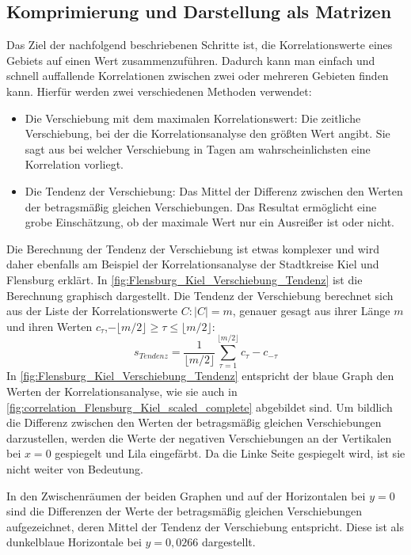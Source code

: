 \subsection{Komprimierung und Darstellung als Matrizen}\label{sec:Grundlagen:Korrelation:Komprimierung}
Das Ziel der nachfolgend beschriebenen Schritte ist, die Korrelationswerte eines Gebiets auf einen Wert zusammenzuführen. Dadurch kann man einfach und schnell auffallende Korrelationen zwischen zwei oder mehreren Gebieten finden kann.
Hierfür werden zwei verschiedenen Methoden verwendet:
\begin{itemize}
    \item Die Verschiebung mit dem maximalen Korrelationswert: Die zeitliche Verschiebung, bei der die Korrelationsanalyse den größten Wert angibt. Sie sagt aus bei welcher Verschiebung in Tagen am wahrscheinlichsten eine Korrelation vorliegt.
    \item Die Tendenz der Verschiebung: 
    Das Mittel der Differenz zwischen den Werten der betragsmäßig gleichen Verschiebungen.
    Das Resultat ermöglicht eine grobe Einschätzung, ob der maximale Wert nur ein Ausreißer ist oder nicht.
\end{itemize}

Die Berechnung der Tendenz der Verschiebung ist etwas komplexer und wird daher ebenfalls am Beispiel der Korrelationsanalyse der Stadtkreise Kiel und Flensburg erklärt.
In \autoref{fig:Flensburg_Kiel_Verschiebung_Tendenz} ist die Berechnung graphisch dargestellt.
Die Tendenz der Verschiebung berechnet sich aus der Liste der Korrelationswerte $C:\vert C\vert =m$, genauer gesagt aus ihrer Länge $m$ und ihren Werten $c_\tau$,$ -\lfloor m/2 \rfloor\geq \tau\leq \lfloor m/2 \rfloor$:
\begin{equation}
    s_{Tendenz} = \frac{1}{\lfloor m/2 \rfloor}
    \sum_{\tau=1}^{\lfloor m/2 \rfloor}c_{\tau}-c_{-\tau}
\end{equation}
In \autoref{fig:Flensburg_Kiel_Verschiebung_Tendenz} entspricht der blaue Graph den Werten der Korrelationsanalyse, wie sie auch in \autoref{fig:correlation_Flensburg_Kiel_scaled_complete} abgebildet sind. Um bildlich die Differenz zwischen den Werten der betragsmäßig gleichen Verschiebungen darzustellen, werden die Werte der negativen Verschiebungen an der Vertikalen bei $x=0$ gespiegelt und Lila eingefärbt.
Da die Linke Seite gespiegelt wird, ist sie nicht weiter von Bedeutung.

In den Zwischenräumen der beiden Graphen und auf der Horizontalen bei $y=0$ sind die Differenzen der Werte der betragsmäßig gleichen Verschiebungen aufgezeichnet, deren Mittel der Tendenz der Verschiebung entspricht. Diese ist als dunkelblaue Horizontale bei $y=0,0266$ dargestellt.

